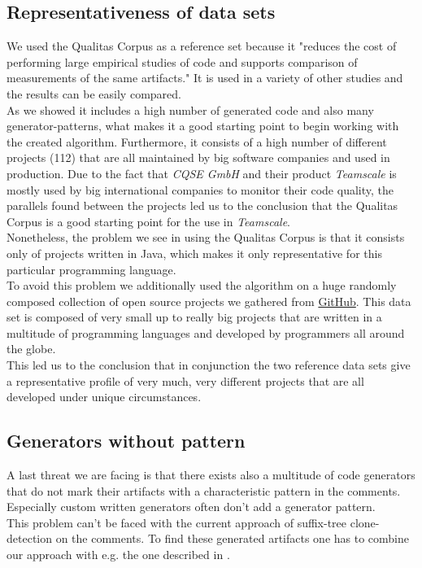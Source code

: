 \subsection{Representativeness of data sets}
We used the Qualitas Corpus as a reference set because it "reduces the cost of performing large empirical studies of code and supports comparison of measurements of the same artifacts."\cite[p.~1]{TemperoEwanandAnslowCraigandDietrichJensandHanTedandLiJingandLumpeMarkusandMeltonHaydenandNoble2010a} It is used in a variety of other studies and the results can be easily compared.\\
As we showed it includes a high number of generated code and also many generator-patterns, what makes it a good starting point to begin working with the created algorithm. Furthermore, it consists of a high number of different projects (112) that are all maintained by big software companies and used in production. Due to the fact that \textit{CQSE GmbH} and their product \textit{Teamscale} is mostly used by big international companies to monitor their code quality, the parallels found between the projects led us to the conclusion that the Qualitas Corpus is a good starting point for the use in \textit{Teamscale}.\\
Nonetheless, the problem we see in using the Qualitas Corpus is that it consists only of projects written in Java, which makes it only representative for this particular programming language. \\
To avoid this problem we additionally used the algorithm on a huge randomly composed collection of open source projects we gathered from \href{github.com}{GitHub}. This data set is composed of very small up to really big projects that are written in a multitude of programming languages and developed by programmers all around the globe. \\
This led us to the conclusion that in conjunction the two reference data sets give a representative profile of very much, very different projects that are all developed under unique circumstances.

\subsection{Generators without pattern}
A last threat we are facing is that there exists also a multitude of code generators that do not mark their artifacts with a characteristic pattern in the comments. Especially custom written generators often don't add a generator pattern.\\
This problem can't be faced with the current approach of suffix-tree clone-detection on the comments. To find these generated artifacts one has to combine our approach with e.g. the one described in \cite{Bernwieser2014}.